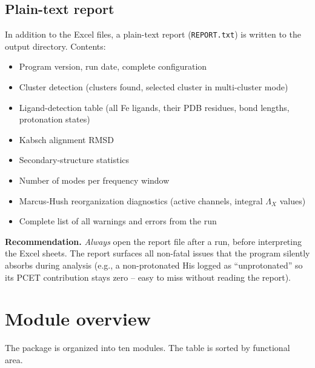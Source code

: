 \documentclass[11pt,a4paper,twoside]{article}
\theoremstyle{remark}
\begin{document}
\subsection{Plain-text report}
\label{sec:befund}

In addition to the Excel files, a plain-text report
(\texttt{REPORT.txt}) is written to the output directory.
Contents:

\begin{itemize}
  \item Program version, run date, complete configuration
  \item Cluster detection (clusters found, selected cluster in
        multi-cluster mode)
  \item Ligand-detection table (all Fe ligands, their PDB
        residues, bond lengths, protonation states)
  \item Kabsch alignment RMSD
  \item Secondary-structure statistics
  \item Number of modes per frequency window
  \item Marcus-Hush reorganization diagnostics (active channels,
        integral $\Lambda_X$ values)
  \item Complete list of all warnings and errors from the run
\end{itemize}

\begin{infobox}
\textbf{Recommendation.} \emph{Always} open the report file
after a run, before interpreting the Excel sheets. The report
surfaces all non-fatal issues that the program silently absorbs
during analysis (e.g., a non-protonated His logged as
``unprotonated'' so its PCET contribution stays zero -- easy to
miss without reading the report).
\end{infobox}

\section{Module overview}
\label{sec:moduluebersicht}

The package is organized into ten modules. The table is sorted by
functional area.
\end{document}
